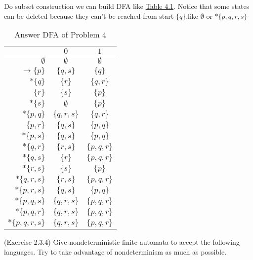 \documentclass[10pt]{homework}
\begin{document}
\begin{solution}
    Do subset construction we can build DFA like \hyperref[tab:problem-4]{Table 4.1}. Notice that some states can be deleted because they can't be reached from start $\{q\}$,like $\emptyset$ or $*\{p,q,r,s\}$
  \begin{table}[!h]
    \centering
    \label{tab:problem-4}
    \begin{tabular}{r||c|c} %
      & $0$ & $1$\\\hline\hline  %
        $\emptyset$ & $\emptyset$ & $\emptyset$\\
        $\rightarrow \{p\}$ & $\{q, s\}$ & $\{q\}$\\
        $*\{q\}$ & $\{r\}$ & $\{q, r\}$\\
        $\{r\}$ & $\{s\}$ & $\{p\}$\\
        $*\{s\}$ & $\emptyset$ & $\{p\}$\\
        $*\{p,q\}$ & $\{q,r,s\}$ & $\{q,r\}$\\
        $\{p,r\}$ & $\{q,s\}$ & $\{p,q\}$\\
        $*\{p,s\}$ & $\{q,s\}$ & $\{p,q\}$\\
        $*\{q,r\}$ & $\{r,s\}$ & $\{p,q,r\}$\\
        $*\{q,s\}$ & $\{r\}$ & $\{p,q,r\}$\\
        $*\{r,s\}$ & $\{s\}$ & $\{p\}$\\
        $*\{q,r,s\}$ & $\{r,s\}$ & $\{p,q,r\}$\\
        $*\{p,r,s\}$ & $\{q,s\}$ & $\{p,q\}$ \\
        $*\{p,q,s\}$ & $\{q,r,s\}$ & $\{p,q,r\}$ \\
        $*\{p,q,r\}$ & $\{q,r,s\}$ & $\{p,q,r\}$\\
        $*\{p,q,r,s\}$ & $\{q,r,s\}$ & $\{p,q,r\}$
    \end{tabular}
    \caption{Answer DFA of Problem 4}
  \end{table}
\end{solution}

\newpage

\begin{problem} (Exercise 2.3.4) Give nondeterministic finite automata to accept
  the following languages.
  Try to take advantage of nondeterminism as much as possible.
\end{problem}
\end{document}
